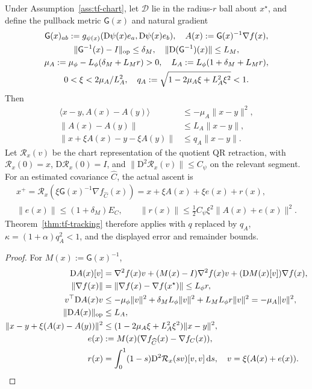 \begin{theorem}
\label{thm:rigid-chart-metric}
Under Assumption~\ref{ass:tf-chart}, let $\mathcal D$ lie in the radius-$r$ ball
about $x^\star$, and define the pullback metric $\mathsf G(x)$ and natural gradient
\begin{gather}
 \mathsf G(x)_{ab}:=g_{\psi(x)}(\mathrm D\psi(x)e_a,\mathrm D\psi(x)e_b),\quad
 A(x):=\mathsf G(x)^{-1}\nabla f(x),\\
 \|\mathsf G^{-1}(x)-I\|_{\mathrm{op}}\le\delta_M,\quad
 \|\mathrm D(\mathsf G^{-1})(x)\|\le L_M,\\
 \mu_A:=\mu_\phi-L_\phi(\delta_M+L_Mr)>0,\quad
 L_A:=L_\phi(1+\delta_M+L_Mr),\\
 0<\xi<2\mu_A/L_A^2,\quad q_A:=\sqrt{1-2\mu_A\xi+L_A^2\xi^2}<1.
\end{gather}
Then
\begin{align}
 \langle x-y,A(x)-A(y)\rangle&\le-\mu_A\|x-y\|^2,\\
 \|A(x)-A(y)\|&\le L_A\|x-y\|,\\
 \|x+\xi A(x)-y-\xi A(y)\|&\le q_A\|x-y\|.
\end{align}
Let $\mathcal R_x(v)$ be the chart representation of the quotient QR retraction,
with $\mathcal R_x(0)=x$, $\mathrm D\mathcal R_x(0)=I$, and
$\|\mathrm D^2\mathcal R_x(v)\|\le C_\psi$ on the relevant segment. For an
estimated covariance $\widehat C$, the actual ascent is
\begin{gather}
 x^+=\mathcal R_x\left(\xi\mathsf G(x)^{-1}\nabla f_{\widehat C}(x)\right)
 =x+\xi A(x)+\xi e(x)+r(x),\\
 \|e(x)\|\le(1+\delta_M)E_C,\qquad
 \|r(x)\|\le\tfrac12 C_\psi\xi^2\|A(x)+e(x)\|^2.
\end{gather}
Theorem~\ref{thm:tf-tracking} therefore applies with $q$ replaced by $q_A$,
$\kappa=(1+\alpha)q_A^2<1$, and the displayed error and remainder bounds.
\end{theorem}
\begin{proof}
For $M(x):=\mathsf G(x)^{-1}$,
\begin{align}
 \mathrm DA(x)[v]&=\nabla^2f(x)v+(M(x)-I)\nabla^2f(x)v
                           +(\mathrm DM(x)[v])\nabla f(x),\\
 \|\nabla f(x)\|&=\|\nabla f(x)-\nabla f(x^\star)\|\le L_\phi r,\\
 v^\top\mathrm DA(x)v
 &\le-\mu_\phi\|v\|^2+\delta_M L_\phi\|v\|^2+L_ML_\phi r\|v\|^2
 =-\mu_A\|v\|^2,\\
 \|\mathrm DA(x)\|_{\mathrm{op}}&\le L_A,\\
 \|x-y+\xi(A(x)-A(y))\|^2
 &\le(1-2\mu_A\xi+L_A^2\xi^2)\|x-y\|^2,\\
 e(x)&:=M(x)(\nabla f_{\widehat C}(x)-\nabla f_C(x)),\\
 r(x)&=\int_0^1(1-s)\mathrm D^2\mathcal R_x(sv)[v,v]\,\mathrm ds,
 \quad v=\xi(A(x)+e(x)).
\end{align}
\end{proof}
